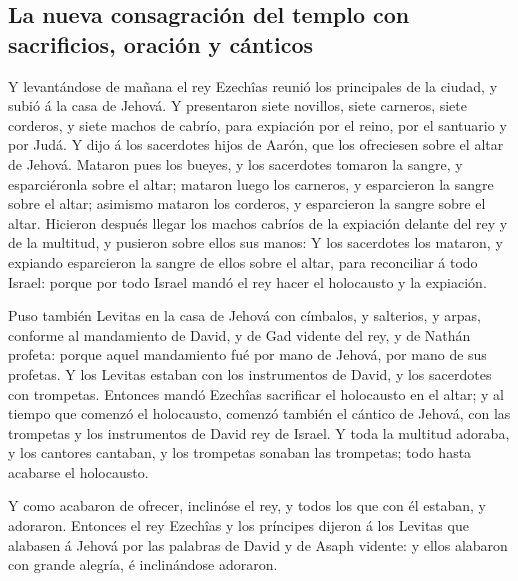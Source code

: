 \hypertarget{la-nueva-consagraciuxf3n-del-templo-con-sacrificios-oraciuxf3n-y-cuxe1nticos}{%
\subsection{La nueva consagración del templo con sacrificios, oración y
cánticos}\label{la-nueva-consagraciuxf3n-del-templo-con-sacrificios-oraciuxf3n-y-cuxe1nticos}}

 Y levantándose de mañana el rey Ezechîas reunió los
principales de la ciudad, y subió á la casa de Jehová.  Y
presentaron siete novillos, siete carneros, siete corderos, y siete
machos de cabrío, para expiación por el reino, por el santuario y por
Judá. Y dijo á los sacerdotes hijos de Aarón, que los ofreciesen sobre
el altar de Jehová.  Mataron pues los bueyes, y los
sacerdotes tomaron la sangre, y esparciéronla sobre el altar; mataron
luego los carneros, y esparcieron la sangre sobre el altar; asimismo
mataron los corderos, y esparcieron la sangre sobre el altar.
 Hicieron después llegar los machos cabríos de la expiación
delante del rey y de la multitud, y pusieron sobre ellos sus manos:
 Y los sacerdotes los mataron, y expiando esparcieron la
sangre de ellos sobre el altar, para reconciliar á todo Israel: porque
por todo Israel mandó el rey hacer el holocausto y la expiación.

 Puso también Levitas en la casa de Jehová con címbalos, y
salterios, y arpas, conforme al mandamiento de David, y de Gad vidente
del rey, y de Nathán profeta: porque aquel mandamiento fué por mano de
Jehová, por mano de sus profetas.  Y los Levitas estaban
con los instrumentos de David, y los sacerdotes con trompetas.
 Entonces mandó Ezechîas sacrificar el holocausto en el
altar; y al tiempo que comenzó el holocausto, comenzó también el cántico
de Jehová, con las trompetas y los instrumentos de David rey de Israel.
 Y toda la multitud adoraba, y los cantores cantaban, y los
trompetas sonaban las trompetas; todo hasta acabarse el holocausto.

 Y como acabaron de ofrecer, inclinóse el rey, y todos los
que con él estaban, y adoraron.  Entonces el rey Ezechîas y
los príncipes dijeron á los Levitas que alabasen á Jehová por las
palabras de David y de Asaph vidente: y ellos alabaron con grande
alegría, é inclinándose adoraron.

